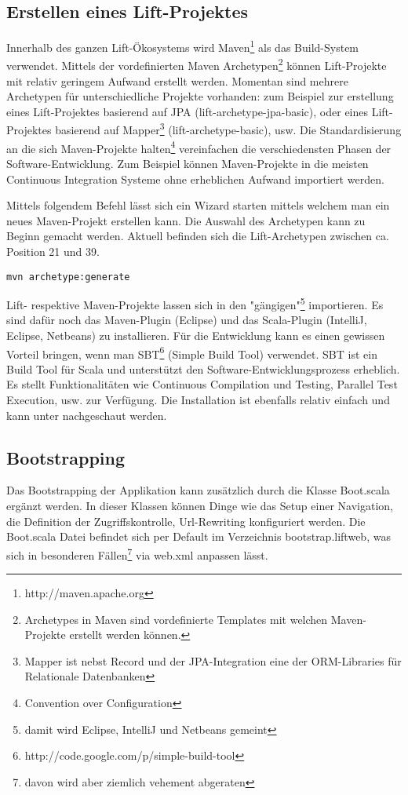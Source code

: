 \subsection{Erstellen eines Lift-Projektes}
Innerhalb des ganzen Lift-\"Okosystems wird Maven\footnote{http://maven.apache.org} als das Build-System verwendet. Mittels der vordefinierten Maven Archetypen\footnote{Archetypes in Maven sind vordefinierte Templates mit welchen Maven-Projekte erstellt werden k\"onnen.} k\"onnen Lift-Projekte mit relativ geringem Aufwand erstellt werden. Momentan sind mehrere Archetypen f\"ur unterschiedliche Projekte vorhanden: zum Beispiel zur erstellung eines Lift-Projektes basierend auf JPA (lift-archetype-jpa-basic), oder eines Lift-Projektes basierend auf Mapper\footnote{Mapper ist nebst Record und der JPA-Integration eine der ORM-Libraries f\"ur Relationale Datenbanken} (lift-archetype-basic), usw.  Die Standardisierung an die sich Maven-Projekte halten\footnote{Convention over Configuration} vereinfachen die verschiedensten Phasen der Software-Entwicklung. Zum Beispiel k\"onnen Maven-Projekte in die meisten Continuous Integration Systeme ohne erheblichen Aufwand importiert werden.

Mittels folgendem Befehl l\"asst sich ein Wizard starten mittels welchem man ein neues Maven-Projekt erstellen kann. Die Auswahl des Archetypen kann zu Beginn gemacht werden. Aktuell befinden sich die Lift-Archetypen zwischen ca. Position 21 und 39.
\begin{lstlisting}[caption=Erstellung eines Lift-Projektes]
mvn archetype:generate
\end{lstlisting}

Lift- respektive Maven-Projekte lassen sich in den "g\"angigen"\footnote{damit wird Eclipse, IntelliJ und Netbeans gemeint} importieren. Es sind daf\"ur noch das Maven-Plugin (Eclipse) und das Scala-Plugin (IntelliJ, Eclipse, Netbeans) zu installieren. F\"ur die Entwicklung kann es einen gewissen Vorteil bringen, wenn man SBT\footnote{http://code.google.com/p/simple-build-tool} (Simple Build Tool) verwendet. SBT ist ein Build Tool f\"ur Scala und unterst\"utzt den Software-Entwicklungsprozess erheblich. Es stellt Funktionalit\"aten wie Continuous Compilation und Testing, Parallel Test Execution, usw. zur Verf\"ugung. Die Installation ist ebenfalls relativ einfach und kann unter \cite{liftweb:using-sbt} nachgeschaut werden.

\subsection{Bootstrapping \cite[p. 26]{chen2009lift}}
Das Bootstrapping der Applikation kann zus\"atzlich durch die Klasse Boot.scala erg\"anzt werden. In dieser Klassen k\"onnen Dinge wie das Setup einer Navigation, die Definition der Zugriffskontrolle, Url-Rewriting konfiguriert werden. Die Boot.scala Datei befindet sich per Default im Verzeichnis bootstrap.liftweb, was sich in besonderen F\"allen\footnote{davon wird aber ziemlich vehement abgeraten} via web.xml anpassen l\"asst.

